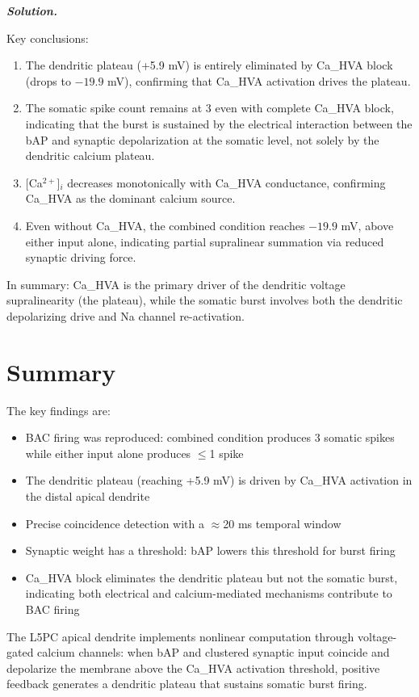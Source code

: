 \documentclass{article}
\newenvironment{solution}{%
    \par\noindent\begin{solutionbox}\textbf{\textit{Solution.}}\par\medskip\itshape
}{%
    \end{solutionbox}
}
\begin{document}
\begin{solution}
Key conclusions:
\begin{enumerate}
    \item The dendritic plateau (+5.9 mV) is entirely eliminated by Ca\_HVA block (drops to $-19.9$ mV), confirming that Ca\_HVA activation drives the plateau.
    \item The somatic spike count remains at 3 even with complete Ca\_HVA block, indicating that the burst is sustained by the electrical interaction between the bAP and synaptic depolarization at the somatic level, not solely by the dendritic calcium plateau.
    \item $[$Ca$^{2+}$]$_i$ decreases monotonically with Ca\_HVA conductance, confirming Ca\_HVA as the dominant calcium source.
    \item Even without Ca\_HVA, the combined condition reaches $-19.9$ mV, above either input alone, indicating partial supralinear summation via reduced synaptic driving force.
\end{enumerate}

In summary: Ca\_HVA is the primary driver of the dendritic voltage supralinearity (the plateau), while the somatic burst involves both the dendritic depolarizing drive and Na channel re-activation.

\section*{Summary}

The key findings are:
\begin{itemize}
    \item BAC firing was reproduced: combined condition produces 3 somatic spikes while either input alone produces $\le$1 spike
    \item The dendritic plateau (reaching +5.9 mV) is driven by Ca\_HVA activation in the distal apical dendrite
    \item Precise coincidence detection with a $\approx$20 ms temporal window
    \item Synaptic weight has a threshold: bAP lowers this threshold for burst firing
    \item Ca\_HVA block eliminates the dendritic plateau but not the somatic burst, indicating both electrical and calcium-mediated mechanisms contribute to BAC firing
\end{itemize}

The L5PC apical dendrite implements nonlinear computation through voltage-gated calcium channels: when bAP and clustered synaptic input coincide and depolarize the membrane above the Ca\_HVA activation threshold, positive feedback generates a dendritic plateau that sustains somatic burst firing.

\end{solution}
\end{document}

